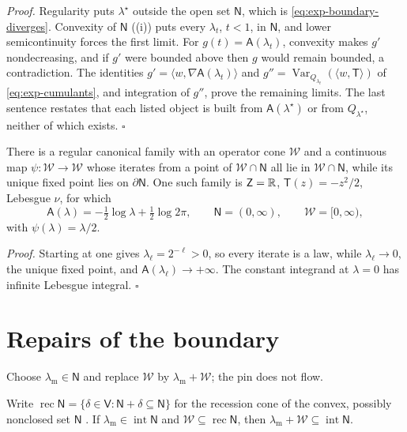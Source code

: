 \noindent\emph{Proof.}
Regularity puts \(\lambda^\star\) outside the open set \(\mathsf N\), which is
\eqref{eq:exp-boundary-diverges}. Convexity of \(\mathsf N\)
((i)) puts every \(\lambda_t\), \(t<1\), in
\(\mathsf N\), and lower semicontinuity forces the first limit. For
\(g(t)=\mathsf A(\lambda_t)\), convexity makes \(g'\) nondecreasing, and if
\(g'\) were bounded above then \(g\) would remain bounded, a contradiction.
The identities \(g'=\langle w,\nabla\mathsf A(\lambda_t)\rangle\) and
\(g''=\operatorname{Var}_{Q_{\lambda_t}}(\langle w,\mathsf T\rangle)\) of
\eqref{eq:exp-cumulants}, and integration of \(g''\), prove the remaining
limits. The last sentence restates that each listed object is built from
\(\mathsf A(\lambda^\star)\) or from \(Q_{\lambda^\star}\), neither of which
exists. \(\square\)

There is a regular canonical family with an operator cone \(\mathcal W\) and a
continuous map \(\psi:\mathcal W\to\mathcal W\) whose iterates from a point of
\(\mathcal W\cap\mathsf N\) all lie in \(\mathcal W\cap\mathsf N\), while its
unique fixed point lies on \(\partial\mathsf N\). One such family is
\(\mathsf Z=\mathbb R\), \(\mathsf T(z)=-z^2/2\), Lebesgue \(\nu\), for which
\begin{equation}
\mathsf A(\lambda)=-\tfrac12\log\lambda+\tfrac12\log2\pi,
\qquad
\mathsf N=(0,\infty),
\qquad
\mathcal W=[0,\infty),
\label{eq:exp-scale-witness}
\end{equation}
with \(\psi(\lambda)=\lambda/2\). 

\noindent\emph{Proof.}
Starting at one gives \(\lambda_\ell=2^{-\ell}>0\), so every iterate is a law,
while \(\lambda_\ell\to0\), the unique fixed point, and
\(\mathsf A(\lambda_\ell)\to+\infty\). The constant integrand at
\(\lambda=0\) has infinite Lebesgue integral. \(\square\)

\section{Repairs of the boundary}
\label{sec:exp-repairs}

Choose \(\lambda_{\mathrm m}\in\mathsf N\) and replace \(\mathcal W\) by
\(\lambda_{\mathrm m}+\mathcal W\); the pin does not flow.

Write
\(\operatorname{rec}\mathsf N=\{\delta\in\mathsf V:\mathsf N+\delta\subseteq\mathsf N\}\)
for the recession cone of the convex, possibly nonclosed set \(\mathsf N\)
\citep[Theorem~8.1]{Rockafellar1970}. If
\(\lambda_{\mathrm m}\in\operatorname{int}\mathsf N\) and
\(\mathcal W\subseteq\operatorname{rec}\mathsf N\), then
\(\lambda_{\mathrm m}+\mathcal W\subseteq\operatorname{int}\mathsf N\).

